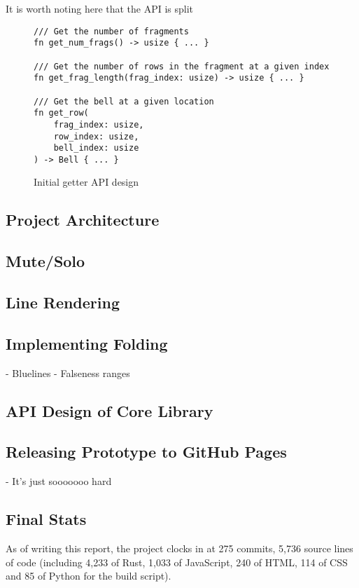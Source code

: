 \documentclass[12pt]{article}
\begin{document}
It is worth noting here that the API is split 

\begin{figure}
\begin{verbatim}
/// Get the number of fragments
fn get_num_frags() -> usize { ... }

/// Get the number of rows in the fragment at a given index
fn get_frag_length(frag_index: usize) -> usize { ... }

/// Get the bell at a given location
fn get_row(
    frag_index: usize,
    row_index: usize,
    bell_index: usize
) -> Bell { ... }
\end{verbatim}
\caption{Initial getter API design}\label{fig:initial_api}
\end{figure}

\subsection{Project Architecture}

\subsection{Mute/Solo}

\subsection{Line Rendering}

\subsection{Implementing Folding}

- Bluelines
- Falseness ranges

\subsection{API Design of Core Library}

\subsection{Releasing Prototype to GitHub Pages}

- It's just sooooooo hard

\subsection{Final Stats}

As of writing this report, the project clocks in at 275 commits, 5,736 source lines of code
(including 4,233 of Rust, 1,033 of JavaScript, 240 of HTML, 114 of CSS and 85 of Python for the
build script).
\end{document}
